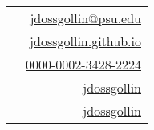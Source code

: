 \begin{minipage}[t][][b]{0.7\linewidth}
	\color{BrickRed}{\Huge James Doss-Gollin}
\end{minipage}%
\begin{minipage}[b][][b]{0.3\linewidth}
	{\color{gray}
		\begin{tabular}{r}
			\faEnvelope~~\href{mailto:jdossgollin@psu.edu}{jdossgollin@psu.edu}                 \\
			\faHome~~\href{https://jdossgollin.github.io}{jdossgollin.github.io}                \\
			{\aiicon{orcid}}~~\href{https://orcid.org/0000-0002-3428-2224}{0000-0002-3428-2224} \\
			\faGithub~~\href{https://github.com/jdossgollin}{jdossgollin}                       \\
			\faTwitter~~\href{https://twitter.com/jdossgollin}{jdossgollin}                     
		\end{tabular}
	}
\end{minipage}
\vspace{0.25in}